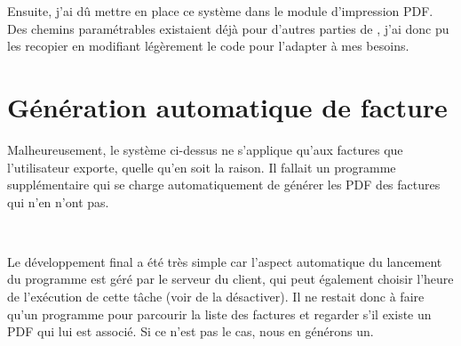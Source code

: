 Ensuite, j'ai dû mettre en place ce système dans le module d'impression PDF. Des chemins paramétrables existaient déjà pour d'autres parties de \integrale, j'ai donc pu les recopier en modifiant légèrement le code pour l'adapter à mes besoins.

\section{Génération automatique de facture}
Malheureusement, le système ci-dessus ne s'applique qu'aux factures que l'utilisateur exporte, quelle qu'en soit la raison. Il fallait un programme supplémentaire qui se charge automatiquement de générer les PDF des factures qui n'en n'ont pas.

~

Le développement final a été très simple car l'aspect automatique du lancement du programme est géré par le serveur du client, qui peut également choisir l'heure de l'exécution de cette tâche (voir de la désactiver). Il ne restait donc à faire qu'un programme pour parcourir la liste des factures et regarder s'il existe un PDF qui lui est associé. Si ce n'est pas le cas, nous en générons un.
